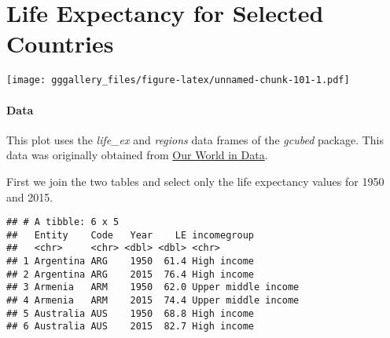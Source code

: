 \documentclass[]{book}
\newenvironment{Shaded}{\begin{snugshade}}{\end{snugshade}}
\newcommand{\DataTypeTok}[1]{\textcolor[rgb]{0.13,0.29,0.53}{#1}}
\newcommand{\DecValTok}[1]{\textcolor[rgb]{0.00,0.00,0.81}{#1}}
\newcommand{\KeywordTok}[1]{\textcolor[rgb]{0.13,0.29,0.53}{\textbf{#1}}}
\newcommand{\NormalTok}[1]{#1}
\newcommand{\OperatorTok}[1]{\textcolor[rgb]{0.81,0.36,0.00}{\textbf{#1}}}
\newcommand{\StringTok}[1]{\textcolor[rgb]{0.31,0.60,0.02}{#1}}
\begin{document}
\hypertarget{lifeexcountries}{%
\chapter*{Life Expectancy for Selected Countries}\label{lifeexcountries}}

\texttt{[image: gggallery\_files/figure-latex/unnamed-chunk-101-1.pdf]}

\hypertarget{lifeexcountriesdata}{%
\subsubsection*{Data}\label{lifeexcountriesdata}}

This plot uses the \emph{life\_ex} and \emph{regions} data frames of the \emph{gcubed} package. This data was originally obtained from \href{https://ourworldindata.org/life-expectancy}{Our World in Data}.

First we join the two tables and select only the life expectancy values for 1950 and 2015.

\begin{Shaded}
\end{Shaded}

\begin{verbatim}
## # A tibble: 6 x 5
##   Entity    Code   Year    LE incomegroup        
##   <chr>     <chr> <dbl> <dbl> <chr>              
## 1 Argentina ARG    1950  61.4 High income        
## 2 Argentina ARG    2015  76.4 High income        
## 3 Armenia   ARM    1950  62.0 Upper middle income
## 4 Armenia   ARM    2015  74.4 Upper middle income
## 5 Australia AUS    1950  68.8 High income        
## 6 Australia AUS    2015  82.7 High income
\end{verbatim}
\end{document}
